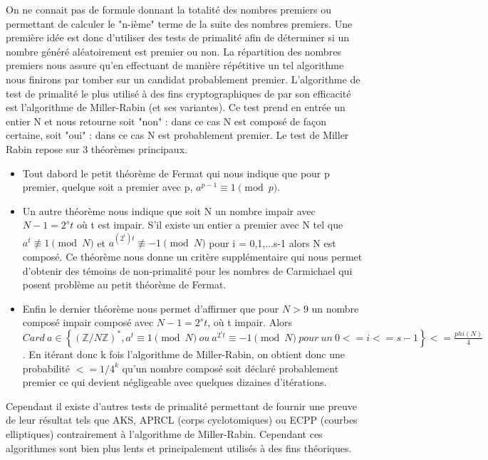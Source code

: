 \documentclass[a4paper,11pt]{article}
\begin{document}
On ne connait pas de formule donnant la totalité des nombres premiers ou permettant de calculer le "n-ième" terme de la suite des nombres premiers. Une première idée est donc d'utiliser des tests de primalité afin de déterminer si un nombre généré aléatoirement est premier ou non. La répartition des nombres premiers nous assure qu'en effectuant de manière répétitive un tel algorithme nous finirons par tomber sur un candidat probablement premier. \newline
L'algorithme de test de primalité le plus utilisé à des fins cryptographiques de par son efficacité  est l'algorithme de Miller-Rabin (et ses variantes). Ce test  prend en entrée un entier N et nous retourne soit "non" : dans ce cas N est composé de façon certaine, soit "oui" : dans ce cas N est probablement premier. \newline
Le test de Miller Rabin repose sur 3 théorèmes
principaux. \newline
\begin{itemize}
\item Tout dabord le petit théorème de Fermat qui nous indique que pour p premier, quelque soit a premier avec p, $a^{p-1} \equiv 1 \pmod p$. \newline

\item Un autre théorème nous indique que soit N un nombre impair avec $N-1 = 2^{s}t$ où t est impair. S'il existe un entier a premier avec N tel que $a^t  \not\equiv 1 \pmod N$ et $a^{(2^i)t} \not\equiv -1 \pmod N$ pour i = 0,1,...s-1 alors N est composé. Ce théorème nous donne un critère supplémentaire qui nous permet d'obtenir des témoins de non-primalité pour les nombres de Carmichael qui posent problème au petit théorème de Fermat. \newline

\item Enfin le dernier théorème nous permet d'affirmer que pour $N > 9$ un nombre composé impair composé avec $N-1 = 2^{s}t$, où t impair. Alors $Card~a \in \left\{(\mathbb{Z}/N\mathbb{Z})^*, a^t \equiv 1 \pmod N~ou~ a^{2^{i}t} \equiv -1 \pmod N~pour~un~0<=i<=s-1\right\} <= \frac{phi(N)}{4}$. En itérant donc k fois l'algorithme de Miller-Rabin, on obtient donc une probabilité $<= 1/4^k$ qu'un nombre composé soit déclaré probablement premier ce qui devient négligeable avec quelques dizaines d'itérations.\newline
\end{itemize} 

Cependant il existe d'autres tests de primalité permettant de fournir une preuve de leur résultat tels que AKS, APRCL (corps cyclotomiques) ou ECPP (courbes elliptiques) contrairement à l'algorithme de Miller-Rabin. Cependant ces algorithmes sont bien plus lents et principalement utilisés à des fins théoriques. \newline
\end{document}
